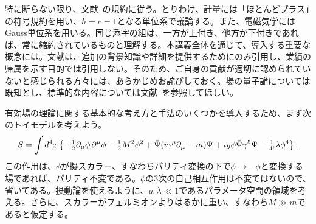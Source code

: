  特に断らない限り、文献~\cite{Srednicki:2007ab}の規約に従う。とりわけ、計量には「ほとんどプラス」の符号規約を用い、$\hbar = c = 1$となる単位系で議論する。また、電磁気学にはGauss単位系を用いる。同じ添字の組は、一方が上付き、他方が下付きであれば、常に縮約されているものと理解する。本講義全体を通じて、導入する重要な概念には。文献は、追加の背景知識や詳細を提供するためにのみ引用し、業績の帰属を示す目的では引用しない。そのため、ご自身の貢献が適切に認められていないと感じられる方々には、あらかじめお詫びしておく。場の量子論については既知とし、標準的な内容については文献~\cite{Srednicki:2007ab}を参照してほしい。


\newpage


 \label{sec: toy model}



有効場の理論に関する基本的な考え方と手法のいくつかを導入するため、まず次のトイモデルを考えよう。
%
\begin{align} \label{full theory}
	S = \int d^4 x \left\{ - \tfrac{1}{2} \partial_\mu \phi \, \partial^\mu \phi - \tfrac{1}{2} M^2 \phi^2 + \bar \Psi (i \gamma^\mu \partial_\mu - m ) \Psi +  i y \phi \bar  \Psi \gamma^5 \Psi - \tfrac{1}{4!} \lambda \phi^4 \right\} .
\end{align}
%
この作用は、$\phi$が擬スカラー、すなわちパリティ変換の下で$\phi \to - \phi$と変換する場であれば、パリティ不変である。$\phi$の3次の自己相互作用は不変ではないので、省いてある。摂動論を使えるように、$y, \lambda \ll 1$であるパラメータ空間の領域を考える。さらに、スカラーがフェルミオンよりはるかに重い、すなわち$M \gg m$であると仮定する。



